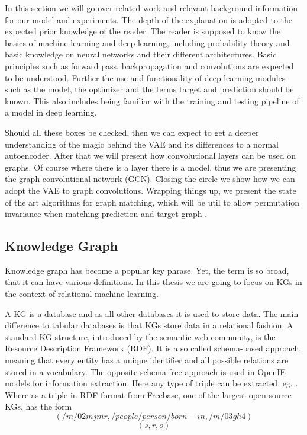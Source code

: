 In this section we will go over related work and relevant background information for our model and experiments. The depth of the explanation is adopted to the expected prior knowledge of the reader. The reader is supposed to know the basics of machine learning and deep learning, including probability theory and basic knowledge on neural networks and their different architectures. Basic principles such as forward pass, backpropagation and convolutions are expected to be understood. Further the use and functionality of deep learning modules such as the model, the optimizer and the terms target and prediction should be known. This also includes being familiar with the training and testing pipeline of a model in deep learning.

Should all these boxes be checked, then we can expect to get a deeper understanding of the magic behind the VAE and its differences to a normal autoencoder. After that we will present how convolutional layers can be used on graphs. Of course where there is a layer there is a model, thus we are presenting the graph convolutional network (GCN). Closing the circle we show how we can adopt the VAE to graph convolutions. Wrapping things up, we present the state of the art algorithms for graph matching, which will be util to allow permutation invariance when matching prediction and target graph \cite{paulheim_knowledge_2016}.  


\subsection{Knowledge Graph}

Knowledge graph has become a popular key phrase. Yet, the term is so broad, that it can have various definitions. In this thesis we are going to focus on KGs in the context of relational machine learning.

A KG is a database and as all other databases it is used to store data. The main difference to tabular databases is that KGs store data in a relational fashion. A standard KG structure, introduced by the semantic-web community, is the Resource
Description Framework (RDF). It is a so called schema-based approach, meaning that every entity has a unique identifier and all possible relations are stored in a vocabulary. The opposite schema-free approach is used in OpenIE models for information extraction. Here any type of triple can be extracted, eg.  . Where as a triple in RDF format from Freebase, one of the largest open-source KGs, has the form
\begin{equation*}
    (/m/02mjmr, /people/person/born-in, /m/03gh4)
\end{equation*}
%  
\begin{equation*}
    (s, r,  o)
\end{equation*}
 
